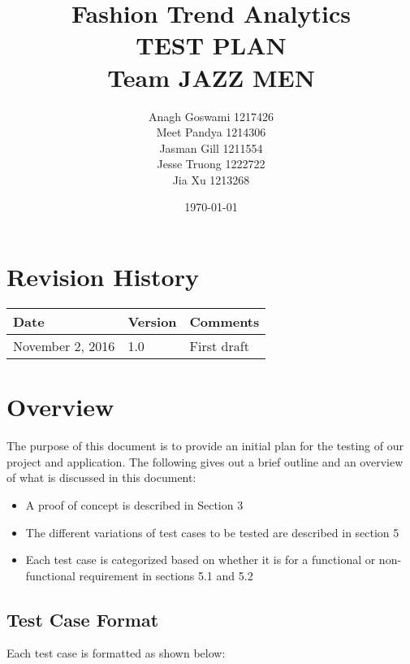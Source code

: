 \documentclass{article}
\begin{document}
\title{\bf \Huge Fashion Trend Analytics\\[\baselineskip]\Large TEST PLAN \\ Team JAZZ MEN}
\author{Anagh Goswami 1217426 \\ Meet Pandya 1214306 \\ Jasman Gill  1211554 \\ Jesse Truong  1222722 \\ Jia Xu  1213268 \\}
\date{\today}

\maketitle

\newpage

\tableofcontents

\section*{Revision History}
\begin{tabular}{|p{5cm}|p{2cm}|p{5cm}|}
\hline
\textbf{Date}  & \textbf{Version} & \textbf{Comments} \\ \hline
November 2, 2016 & 1.0 &  First draft \\ 
\hline
\end{tabular}

\newpage

\section{Overview}

The purpose of this document is to provide an initial plan for the testing of our project and application. The following gives out a brief outline and an overview of what is discussed in this document:
	\begin{itemize}
		\item A proof of concept is described in Section 3
		\item The different variations of test cases to be tested are described in section 5
		\item Each test case is categorized based on whether it is for a functional or non-functional requirement in sections 5.1 and 5.2
	\end{itemize}

	\subsection{Test Case Format}
	Each test case is formatted as shown below:
\end{document}
